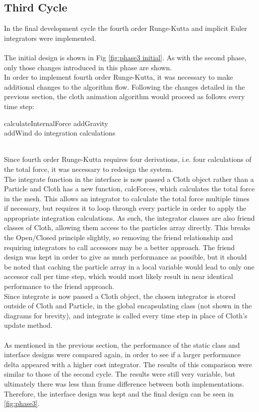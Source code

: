 \subsection{Third Cycle}
In the final development cycle the fourth order Runge-Kutta and implicit Euler integrators were implemented.
\\\\The initial design is shown in Fig \ref{fig:phase3 initial}. As with the second phase, only those changes introduced in this phase are shown.
\\In order to implement fourth order Runge-Kutta, it was necessary to make additional changes to the algorithm flow. Following the changes detailed in the previous section, the cloth animation algorithm would proceed as follows every time step:
\begin{algorithm}[h]
  \SetAlgoLined
  \SetNoFillComment
   {
    calculateInternalForce
  }
   {
    addGravity
    \\ {
      addWind
    }
    do integration calculations
  }
\end{algorithm}
\\Since fourth order Runge-Kutta requires four derivations, i.e. four calculations of the total force, it was necessary to redesign the system.
\\The integrate function in the interface is now passed a Cloth object rather than a Particle and Cloth has a new function, calcForces, which calculates the total force in the mesh. This allows an integrator to calculate the total force multiple times if necessary, but requires it to loop through every particle in order to apply the appropriate integration calculations. As such, the integrator classes are also friend classes of Cloth, allowing them access to the particles array directly. This breaks the Open/Closed principle slightly, so removing the friend relationship and requiring integrators to call accessors may be a better approach. The friend design was kept in order to give as much performance as possible, but it should be noted that caching the particle array in a local variable would lead to only one accessor call per time step, which would most likely result in near identical performance to the friend approach.
\\Since integrate is now passed a Cloth object, the chosen integrator is stored outside of Cloth and Particle, in the global encapsulating class (not shown in the diagrams for brevity), and integrate is called every time step in place of Cloth's update method.
\\\\As mentioned in the previous section, the performance of the static class and interface designs were compared again, in order to see if a larger performance delta appeared with a higher cost integrator. The results of this comparison were similar to those of the second cycle. The results were still very variable, but ultimately there was less than frame difference between both implementations. Therefore, the interface design was kept and the final design can be seen in \ref{fig:phase3}.

